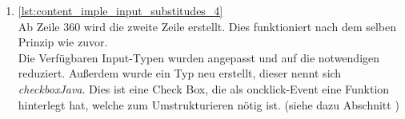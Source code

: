 \begin{enumerate}
	\item \autoref{lst:content_imple_input_substitudes_4}\\
	Ab Zeile 360 wird die zweite Zeile erstellt. Dies funktioniert nach dem selben Prinzip wie zuvor.\\
	Die Verfügbaren Input-Typen wurden angepasst und auf die notwendigen reduziert. Außerdem wurde ein Typ neu erstellt, dieser nennt sich \textit{checkboxJava}. Dies ist eine Check Box, die als oncklick-Event eine Funktion hinterlegt hat, welche zum Umstrukturieren nötig ist. (siehe dazu Abschnitt )	
	
	
\end{enumerate}
